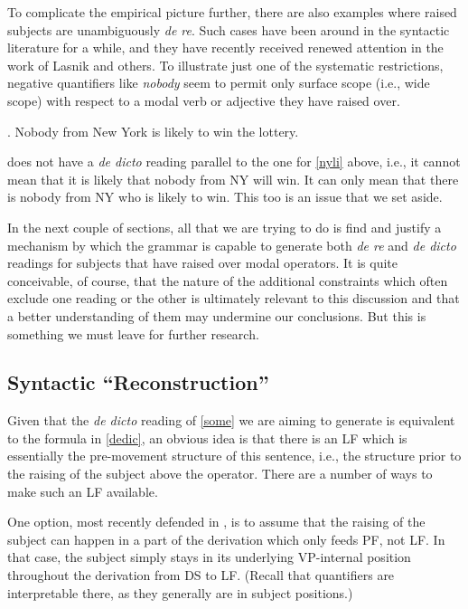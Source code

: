 To complicate the empirical picture further, there are also examples where raised subjects are unambiguously \emph{de re}. Such cases have been around in the syntactic literature for a while, and they have recently received renewed attention in the work of Lasnik and others. To illustrate just one of the systematic restrictions, negative quantifiers like \emph{nobody} seem to permit only surface scope (i.e., wide scope) with respect to a modal verb or adjective they have raised over.

\ex. Nobody from New York is likely to win the lottery.

\Last does not have a \emph{de dicto} reading parallel to the one for \ref{nyli} above, i.e., it cannot mean that it is likely that nobody from NY will win. It can only mean that there is nobody from NY who is likely to win. This too is an issue that we set aside.

In the next couple of sections, all that we are trying to do is find and justify a mechanism by which the grammar is capable to generate both \emph{de re} and \emph{de dicto} readings for subjects that have raised over modal operators. It is quite conceivable, of course, that the nature of the additional constraints which often exclude one reading or the other is ultimately relevant to this discussion and that a better understanding of them may undermine our conclusions. But this is something we must leave for further research.

\subsection{Syntactic ``Reconstruction''}

Given that the \emph{de dicto} reading of \ref{some} we are aiming to generate is equivalent to the formula in \ref{dedic}, an obvious idea is that there is an LF which is essentially the pre-movement structure of this sentence, i.e., the structure prior to the raising of the subject above the operator. There are a number of ways to make such an LF available.

One option, most recently defended in \citet{sauerland-elbourne:2002:total}, is to assume that the raising of the subject can happen in a part of the derivation which only feeds PF, not LF. In that case, the subject simply stays in its underlying VP-internal position throughout the derivation from DS to LF. (Recall that quantifiers are interpretable there, as they generally are in subject positions.)


